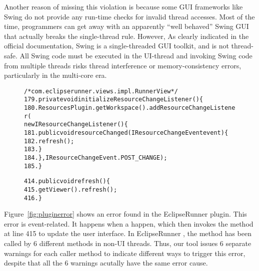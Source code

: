 Another reason of missing this violation is because some GUI frameworks like Swing
do not provide any run-time checks for invalid thread accesses. Most
of the time, programmers can get away with an apparently ``well behaved'' Swing
GUI that actually breaks the single-thread rule. However, As clearly
indicated in the official documentation, Swing is a single-threaded GUI
toolkit, and is not thread-safe. All Swing code must be executed in the UI-thread and
invoking Swing code from multiple threads risks thread interference
or memory-consistency errors, particularly in the multi-core era.



\begin{figure}[t]
\begin{CodeOut}
\begin{alltt} 
/* com.eclipserunner.views.impl.RunnerView */
179.private void initializeResourceChangeListener() \{
180.  ResourcesPlugin.getWorkspace().addResourceChangeListener(
        new IResourceChangeListener() \{
181.      public void resourceChanged(IResourceChangeEvent event) \{
182.        refresh();
183.      \}
184.  \}, IResourceChangeEvent.POST\_CHANGE);
185.\}

414.public void refresh() \{
415.  getViewer().refresh();
416.\}
\end{alltt}
\end{CodeOut}
\vspace*{-2.0ex}  %
\end{figure}

Figure~\ref{fig:pluginerror} shows an error found in the EclipseRunner
plugin. This error is event-related. It happens when a 
 happen, which then invokes the 
method at line 415 to update the user interface. In EclipseRunner
, the  method has been
called by 6 different methods in non-UI threads. Thus, our
tool issues 6 separate warnings for each caller method to indicate
different ways to trigger this error, despite that all the 6 warnings
acutally have the same error cause.

